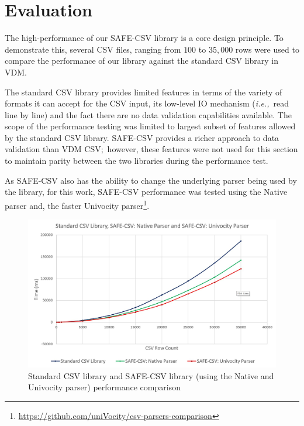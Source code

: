 \documentclass[runningheads,a4paper]{llncs}
\begin{document}
\section{Evaluation}\label{sec:Evaluation}

The high-performance of our SAFE-CSV library is a core design principle. To demonstrate this, several CSV files, ranging from \(100\) to \(35,000\) rows were used to compare the performance of our library against the standard CSV library in VDM.

The standard CSV library provides limited features in terms of the variety of formats it can accept for the CSV input, its low-level IO mechanism (\textit{i.e.,}~read line by line) and the fact there are no data validation capabilities available. The scope of the performance testing was limited to largest subset of features allowed by the standard CSV library. SAFE-CSV provides a richer approach to data validation than VDM CSV;~however, these features were not used for this section to maintain parity between the two libraries during the performance test. 


As SAFE-CSV also has the ability to change the underlying parser being used by the library, for this work, SAFE-CSV performance was tested using the Native parser and, the faster Univocity parser\footnote{\url{https://github.com/uniVocity/csv-parsers-comparison}}. 

\begin{figure}[ht]
    \centering
        \includegraphics[width=\textwidth]{figures/CSVPerformanceChart.jpg}
    \caption{Standard CSV library and SAFE-CSV library (using the Native and Univocity parser) performance comparison}\label{fig:CSVPerformanceChart}
 \end{figure}
\end{document}
